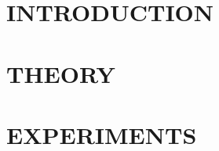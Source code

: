 \documentclass[a4paper,12pt]{report}
\begin{document}






\tableofcontents
\thispagestyle{empty}
\setcounter{page}{0}

\newpage
\chapter{INTRODUCTION}


\chapter{THEORY}


\chapter{EXPERIMENTS}




\end{document}
